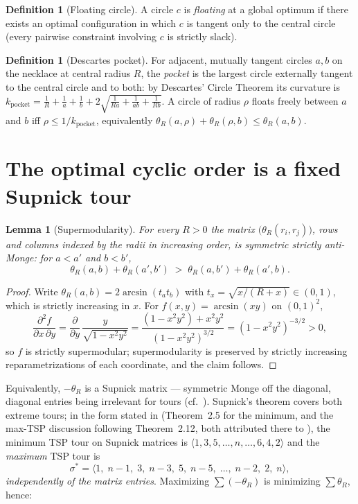 \documentclass[11pt]{article}
\newtheorem{lemma}[theorem]{Lemma}
\theoremstyle{definition}
\newtheorem{definition}[theorem]{Definition}
\theoremstyle{remark}
\DeclareMathOperator{\asin}{arcsin}
\begin{document}
\begin{definition}[Floating circle]
A circle $c$ is \emph{floating} at a global optimum if there exists an optimal configuration in which $c$ is tangent only to the central circle (every pairwise constraint involving $c$ is strictly slack).
\end{definition}

\begin{definition}[Descartes pocket]
For adjacent, mutually tangent circles $a,b$ on the necklace at central radius $R$, the \emph{pocket} is the largest circle externally tangent to the central circle and to both: by Descartes' Circle Theorem its curvature is
$k_{\mathrm{pocket}}=\frac1R+\frac1a+\frac1b+2\sqrt{\frac1{Ra}+\frac1{ab}+\frac1{Rb}}$.
A circle of radius $\rho$ floats freely between $a$ and $b$ iff $\rho\le 1/k_{\mathrm{pocket}}$, equivalently $\theta_R(a,\rho)+\theta_R(\rho,b)\le\theta_R(a,b)$.
\end{definition}

\section{The optimal cyclic order is a fixed Supnick tour}\label{sec:theoremA}

\begin{lemma}[Supermodularity]\label{lem:supermodular}
For every $R>0$ the matrix $\big(\theta_R(r_i,r_j)\big)$, rows and columns indexed by the radii in increasing order, is symmetric strictly anti-Monge: for $a<a'$ and $b<b'$,
\[
\theta_R(a,b)+\theta_R(a',b') \;>\; \theta_R(a,b')+\theta_R(a',b).
\]
\end{lemma}

\begin{proof}
Write $\theta_R(a,b)=2\asin(t_a t_b)$ with $t_x=\sqrt{x/(R+x)}\in(0,1)$, which is strictly increasing in $x$. For $f(x,y)=\asin(xy)$ on $(0,1)^2$,
\[
\frac{\partial^2 f}{\partial x\,\partial y}
=\frac{\partial}{\partial y}\,\frac{y}{\sqrt{1-x^2y^2}}
=\frac{(1-x^2y^2)+x^2y^2}{(1-x^2y^2)^{3/2}}
=(1-x^2y^2)^{-3/2}>0,
\]
so $f$ is strictly supermodular; supermodularity is preserved by strictly increasing reparametrizations of each coordinate, and the claim follows.
\end{proof}

Equivalently, $-\theta_R$ is a Supnick matrix --- symmetric Monge off the diagonal, diagonal entries being irrelevant for tours (cf.\ \cite[Prop.~2.13]{bdvvw}). Supnick's theorem \cite{supnick} covers both extreme tours; in the form stated in \cite{bdvvw} (Theorem~2.5 for the minimum, and the max-TSP discussion following Theorem~2.12, both attributed there to \cite{supnick}), the minimum TSP tour on Supnick matrices is $\langle 1,3,5,\dots,n,\dots,6,4,2\rangle$ and the \emph{maximum} TSP tour is
\[
\sigma^\ast=\langle 1,\; n-1,\; 3,\; n-3,\; 5,\; n-5,\;\dots,\; n-2,\; 2,\; n\rangle,
\]
\emph{independently of the matrix entries}. Maximizing $\sum(-\theta_R)$ is minimizing $\sum\theta_R$, hence:
\end{document}
